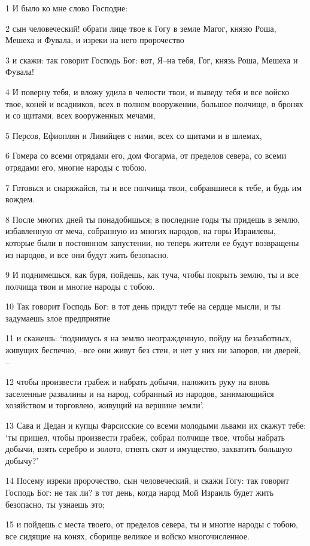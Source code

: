 \par 1 И было ко мне слово Господне:
\par 2 сын человеческий! обрати лице твое к Гогу в земле Магог, князю Роша, Мешеха и Фувала, и изреки на него пророчество
\par 3 и скажи: так говорит Господь Бог: вот, Я--на тебя, Гог, князь Роша, Мешеха и Фувала!
\par 4 И поверну тебя, и вложу удила в челюсти твои, и выведу тебя и все войско твое, коней и всадников, всех в полном вооружении, большое полчище, в бронях и со щитами, всех вооруженных мечами,
\par 5 Персов, Ефиоплян и Ливийцев с ними, всех со щитами и в шлемах,
\par 6 Гомера со всеми отрядами его, дом Фогарма, от пределов севера, со всеми отрядами его, многие народы с тобою.
\par 7 Готовься и снаряжайся, ты и все полчища твои, собравшиеся к тебе, и будь им вождем.
\par 8 После многих дней ты понадобишься; в последние годы ты придешь в землю, избавленную от меча, собранную из многих народов, на горы Израилевы, которые были в постоянном запустении, но теперь жители ее будут возвращены из народов, и все они будут жить безопасно.
\par 9 И поднимешься, как буря, пойдешь, как туча, чтобы покрыть землю, ты и все полчища твои и многие народы с тобою.
\par 10 Так говорит Господь Бог: в тот день придут тебе на сердце мысли, и ты задумаешь злое предприятие
\par 11 и скажешь: `поднимусь я на землю неогражденную, пойду на беззаботных, живущих беспечно, --все они живут без стен, и нет у них ни запоров, ни дверей, --
\par 12 чтобы произвести грабеж и набрать добычи, наложить руку на вновь заселенные развалины и на народ, собранный из народов, занимающийся хозяйством и торговлею, живущий на вершине земли'.
\par 13 Сава и Дедан и купцы Фарсисские со всеми молодыми львами их скажут тебе: `ты пришел, чтобы произвести грабеж, собрал полчище твое, чтобы набрать добычи, взять серебро и золото, отнять скот и имущество, захватить большую добычу?'
\par 14 Посему изреки пророчество, сын человеческий, и скажи Гогу: так говорит Господь Бог: не так ли? в тот день, когда народ Мой Израиль будет жить безопасно, ты узнаешь это;
\par 15 и пойдешь с места твоего, от пределов севера, ты и многие народы с тобою, все сидящие на конях, сборище великое и войско многочисленное.
